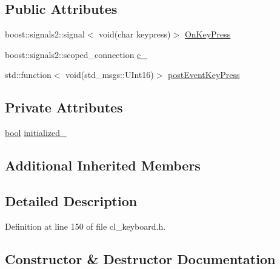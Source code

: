 \subsection*{Public Attributes}
\begin{DoxyCompactItemize}
\item 
boost\+::signals2\+::signal$<$ void(char keypress)$>$ \hyperlink{classsm__three__some_1_1cl__keyboard_1_1ClKeyboard_a702f3984db0073247b7d216b5c36e317}{On\+Key\+Press}
\item 
boost\+::signals2\+::scoped\+\_\+connection \hyperlink{classsm__three__some_1_1cl__keyboard_1_1ClKeyboard_ab56d189c1d117cc0d3d57595b9bf76a9}{c\+\_\+}
\item 
std\+::function$<$ void(std\+\_\+msgs\+::\+U\+Int16)$>$ \hyperlink{classsm__three__some_1_1cl__keyboard_1_1ClKeyboard_abb3140ba3850b4e20f201a697b7f8388}{post\+Event\+Key\+Press}
\end{DoxyCompactItemize}
\subsection*{Private Attributes}
\begin{DoxyCompactItemize}
\item 
\hyperlink{classbool}{bool} \hyperlink{classsm__three__some_1_1cl__keyboard_1_1ClKeyboard_a4d0fead601bf70c79b6fc4b8688d5d18}{initialized\+\_\+}
\end{DoxyCompactItemize}
\subsection*{Additional Inherited Members}


\subsection{Detailed Description}


Definition at line 150 of file cl\+\_\+keyboard.\+h.



\subsection{Constructor \& Destructor Documentation}
